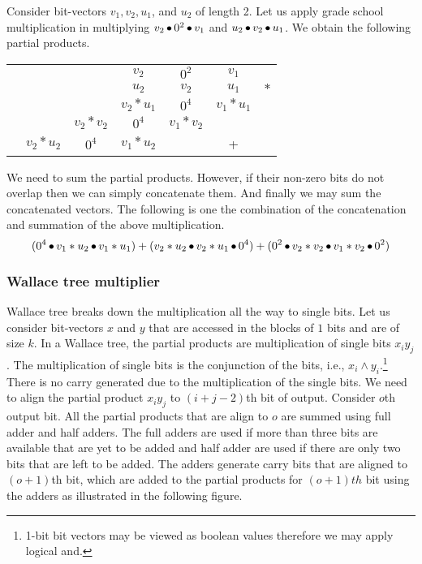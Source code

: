\begin{example}
  Consider bit-vectors $v_1,v_2,u_1$, and $u_2$ of length 2.
  Let us apply grade school multiplication in multiplying
  $v_2 \mathop{\bullet} 0^2 \mathop{\bullet} v_1$ and $u_2 \mathop{\bullet} v_2 \mathop{\bullet} u_1$.
  We obtain the following partial products.
\begin{center}
\begin{tabular}{c@{\quad}c@{\quad}c@{\quad}c@{\quad}c@{\quad}c@{\quad}c}
  &&& $v_2$ & $0^2$ & $v_1$&\\ 
  &&& $u_2$ & $v_2$ & $u_1$&$*$\\ \hline
  &&&$v_2*u_1$& $0^4$ & $v_1*u_1$&\\
  &&$v_2*v_2$&$0^4$& $v_1*v_2$ && \\
  &$v_2*u_2$& $0^4$ &$v_1*u_2$&  & +&\\\hline
\end{tabular}
\end{center}
We need to sum the partial products. However, if their non-zero bits 
do not overlap then we can simply concatenate them.
%
And finally we may sum the concatenated vectors.
%
The following is one the combination of the concatenation and 
summation of the above multiplication.
$$
( 0^4 \mathop{\bullet} v_1*u_2 \mathop{\bullet} v_1*u_1)+ (v_2*u_2 \mathop{\bullet} v_2*u_1 \mathop{\bullet} 0^4)+ (0^2 \mathop{\bullet} v_2*v_2 \mathop{\bullet} v_1*v_2 \mathop{\bullet} 0^2)
$$
\end{example}


\subsubsection{Wallace tree multiplier}
%
Wallace tree breaks down the multiplication all the way to single bits.
%
Let us consider bit-vectors $x$ and $y$ that are accessed in the blocks of $1$
bits and are of size $k$.
%
In a Wallace tree, the partial products are multiplication of single
bits $x_iy_j$.
%
The multiplication of single bits is the conjunction of the bits, i.e.,
$x_i \land y_i$.\footnote{1-bit bit vectors may be viewed as boolean values therefore we may apply logical and.}
%
There is no carry generated due to the multiplication of the single bits.
%
We need to align the partial product $x_iy_j$ to $(i+j-2)$th bit of output.
%
Consider $o$th output bit.
%
All the partial products that are align to $o$ are summed using full adder 
and half adders.
%
The full adders are used
if more than three bits are available that are yet to be added
and half adder are used if there are only two bits that are left to be added.
%
The adders generate carry bits that are aligned to $(o+1)$th bit,
which are added to the partial products for $(o+1)th$ bit using the 
adders as illustrated in the following figure.

